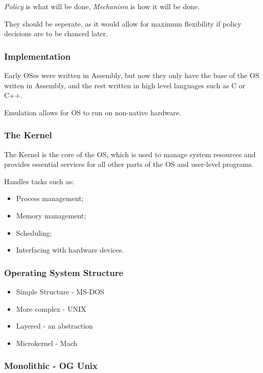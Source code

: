 \documentclass[]{article}
\begin{document}
\emph{Policy} is what will be done, \emph{Mechanism} is how it will be done.

They should be seperate, as it would allow for maximum flexibility if policy decisions are to be chanced later.

\subsubsection*{Implementation}

Early OSes were written in Assembly, but now they only have the base of the OS writen in Assembly, and the rest written in high level languages such as C or C++.

Emulation allows for OS to run on non-native hardware.

\subsubsection*{The Kernel}

The Kernel is the core of the OS, which is used to manage system resources and provides essential services for all other parts of the OS and user-level programs.

Handles tasks such as:
\begin{itemize}
    \item Process management;
    \item Memory management;
    \item Scheduling;
    \item Interfacing with hardware devices.
\end{itemize}

\subsubsection*{Operating System Structure}

\begin{itemize}
    \item Simple Structure - MS-DOS
    \item More complex - UNIX
    \item Layered - an abstraction
    \item Microkernel - Mach
\end{itemize}

\subsubsection*{Monolithic - OG Unix}
\end{document}
